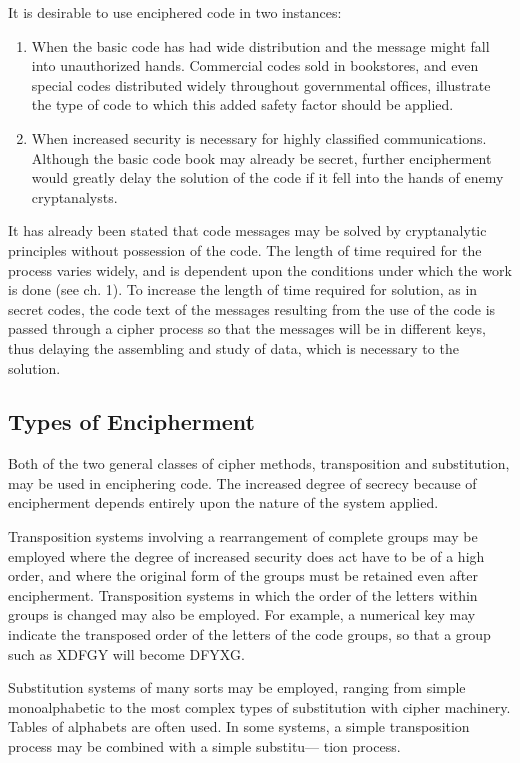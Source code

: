 \mypara It is desirable to use enciphered code in two instances:

\begin{enumerate}
\item When the basic code has had wide distribution and the message
might fall into unauthorized hands. Commercial codes sold in
bookstores, and even special codes distributed widely throughout
governmental ofﬁces, illustrate the type of code to which this
added safety factor should be applied.

\item When increased security is necessary for highly classiﬁed
communications. Although the basic code book may already be
secret, further encipherment would greatly delay the solution of
the code if it fell into the hands of enemy cryptanalysts.
\end{enumerate}

\mypara It has already been stated that code messages may be solved by
cryptanalytic principles without possession of the code. The length of
time required for the process varies widely, and is dependent upon the
conditions under which the work is done (see ch. 1). To increase the
length of time required for solution, as in secret codes, the code text of
the messages resulting from the use of the code is passed through a
cipher process so that the messages will be in different keys, thus delaying
the assembling and study of data, which is necessary to the solution.

\subsection{Types of Encipherment}

\mypara Both of the two general classes of cipher methods, transposition
and substitution, may be used in enciphering code. The increased degree
of secrecy because of encipherment depends entirely upon the nature of
the system applied.

\mypara Transposition systems involving a rearrangement of complete
groups may be employed where the degree of increased security does act
have to be of a high order, and where the original form of the groups
must be retained even after encipherment. Transposition systems in
which the order of the letters within groups is changed may also be
employed. For example, a numerical key may indicate the transposed
order of the letters of the code groups, so that a group such as XDFGY
will become DFYXG.

\mypara Substitution systems of many sorts may be employed, ranging from
simple monoalphabetic to the most complex types of substitution with
cipher machinery. Tables of alphabets are often used. In some systems,
a simple transposition process may be combined with a simple substitu—
tion process.

